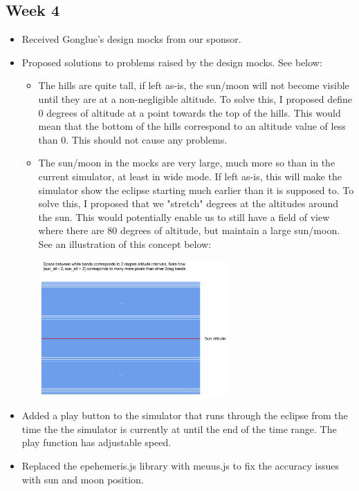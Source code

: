 \documentclass[10pt, onecolumn, draftclsnofoot, letterpaper, compsoc]{IEEEtran}
\begin{document}
\subsection{Week 4}

    \begin{itemize}

    \item Received Gonglue's design mocks from our sponsor.

	\item Proposed solutions to problems raised by the design mocks. See below:

		\begin{itemize}

		\item The hills are quite tall, if left as-is, the sun/moon will not become
			  visible until they are at a non-negligible altitude. To solve this,
			  I proposed define 0 degrees of altitude at a point towards the top of the
			  hills. This would mean that the bottom of the hills correspond to an altitude
			  value of less than 0. This should not cause any problems.

		\item The sun/moon in the mocks are very large, much more so than in the current
			  simulator, at least in wide mode. If left as-is, this will make the simulator
			  show the eclipse starting much earlier than it is supposed to. To solve this, I
			  proposed that we "stretch" degrees at the altitudes around the sun. This would
			  potentially enable us to still have a field of view where there are 80 degrees
			  of altitude, but maintain a large sun/moon. See an illustration of this concept below:

			  \begin{center}
			  	\includegraphics[width=0.6\textwidth]{angle.eps}
			  \end{center}

		\end{itemize}

    \item Added a play button to the simulator that runs through the eclipse from the time the
          the simulator is currently at until the end of the time range. The play function has
          adjustable speed.

    \item Replaced the epehemeris.js library with meuus.js to fix the accuracy issues with sun and
          moon position.

    \end{itemize}
\end{document}
